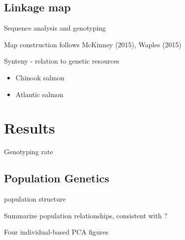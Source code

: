 \documentclass[12pt,  one column]{article}
\begin{document}
\subsection*{Linkage map}

Sequence analysis and genotyping


Map construction follows McKinney (2015), Waples (2015)

Synteny - relation to genetic resources
\begin{itemize}[nosep]
	\item Chinook salmon
    \item Atlantic salmon
\end{itemize}





\pagebreak
\section*{Results}

Genotyping rate
\subsection*{Population Genetics}
population structure

Summarize population relationships, consistent with \citet{Small2014}?

Four individual-based PCA figures
\end{document}
